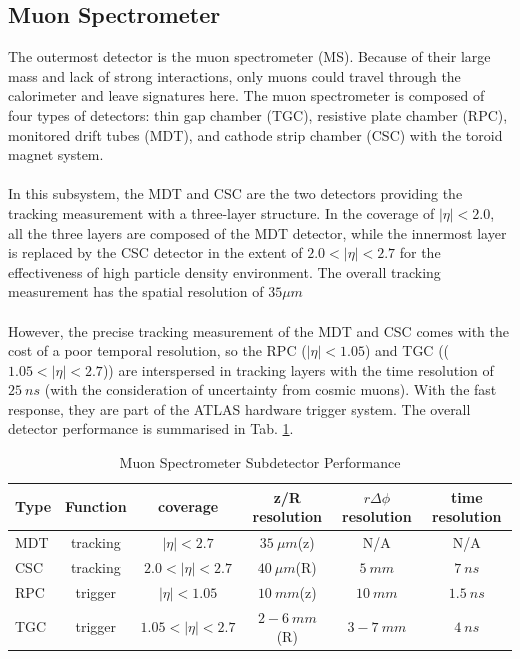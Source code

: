 \subsection{Muon Spectrometer\cite{MS_all}}
The outermost detector is the muon spectrometer (MS). Because of their large mass and lack of strong interactions, only muons could travel through the calorimeter and leave signatures here. The muon spectrometer is composed of four types of detectors: thin gap chamber (TGC), resistive plate chamber (RPC), monitored drift tubes (MDT), and cathode strip chamber (CSC) with the toroid magnet system.  
\\
\\In this subsystem, the MDT and CSC are the two detectors providing the tracking measurement with a three-layer structure. In the coverage of $|\eta|<2.0$, all the three layers are composed of the MDT detector, while the innermost layer is replaced by the CSC detector in the extent of $2.0<|\eta|<2.7$ for the effectiveness of high particle density environment. The overall tracking measurement has the spatial resolution of $35 \mu m$
\\
\\However, the precise tracking measurement of the MDT and CSC comes with the cost of a poor temporal resolution, so the RPC ($|\eta|<1.05$) and TGC (($1.05<|\eta|<2.7$)) are interspersed in tracking layers with the time resolution of $25~ns$ (with the consideration of uncertainty from cosmic muons). With the fast response, they are part of the ATLAS hardware trigger system. The overall detector performance is summarised in Tab. \ref{Tab:ms}.

\begin{table}[h]
	\caption{Muon Spectrometer Subdetector Performance}
	\renewcommand{\arraystretch}{1.3}
	\centering
	\begin{tabular}{l | c | c | c | c | c }
		\hline
		\hline
		{\bf Type}     &{\bf Function} &{\bf coverage}    &{\bf z/R resolution}  &{\bf $r \Delta \phi$ resolution}&{\bf time resolution}\\
		\hline
		MDT            &tracking       &$|\eta|<2.7$      &$35~\mu m$(z)          &N/A                             &N/A            \\
		\hline
		CSC            &tracking       &$2.0<|\eta|<2.7$  &$40~\mu m$(R)          &$5~mm$                           &$7~ns$          \\
		\hline
		RPC            &trigger        &$|\eta|<1.05$     &$10~mm$(z)             &$10~mm$                          &$1.5~ns$         \\
		\hline
		TGC            &trigger        &$1.05<|\eta|<2.7$ &$2-6~mm$(R)            &$3-7~mm$                         &$4~ns$           \\
		\hline
	\end{tabular}
	\label{Tab:ms}
\end{table}

